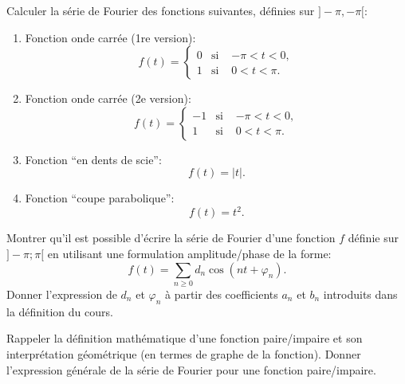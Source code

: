 \begin{exercice}

Calculer la série de Fourier des fonctions suivantes, définies sur $]-\pi,-\pi[$:

\begin{enumerate}
 \item Fonction onde carrée (1re version):
 \[
  f(t) = \left \{ \begin{array}{llr} 
  0  & \mbox{si }& -\pi<t<0,\\
  1  & \mbox{si }& 0<t<\pi.
  \end{array}\right.
 \]


 \item Fonction onde carrée (2e version):
 \[
  f(t) = \left \{ \begin{array}{llr} 
  -1 & \mbox{si }& -\pi<t<0,\\
  1  & \mbox{si }& 0<t<\pi.
  \end{array}\right.
 \]
 \item Fonction ``en dents de scie'':
 \[
  f(t) = |t|.
 \]
 \item Fonction ``coupe parabolique'':
 \[
  f(t) = t^2.
 \]

\end{enumerate}

\end{exercice}

\medskip

\begin{exercice}

Montrer qu'il est possible d'écrire la série de Fourier d'une fonction $f$ définie sur $]-\pi;\pi[$ en utilisant une formulation amplitude/phase de la forme:
\[
 f(t) = \sum_{n\geq 0} d_n \cos( n t + \varphi_n).
\]
Donner l'expression de $d_n$ et $\varphi_n$ à partir des coefficients $a_n$ et $b_n$ introduits dans la définition du cours.

\end{exercice}

\medskip

\begin{exercice}

Rappeler la définition mathématique d'une fonction paire/impaire et son interprétation géométrique (en termes de graphe de la fonction).
Donner l'expression générale de la série de Fourier pour une fonction paire/impaire.
 
\end{exercice}

\medskip

% 
% 
% 

